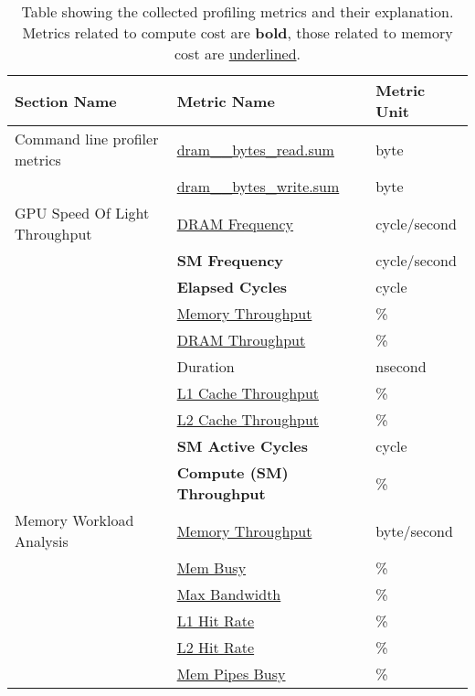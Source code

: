 \begin{table}[ht]
    \begin{tabular}{lll}
        \toprule
        Section Name                  & Metric Name                          & Metric Unit  \\
        \midrule\midrule
        Command line profiler metrics & \underline{dram\_\_bytes\_read.sum}  & byte         \\
                                      & \underline{dram\_\_bytes\_write.sum} & byte         \\
        GPU Speed Of Light Throughput & \underline{DRAM Frequency}           & cycle/second \\
                                      & \textbf{SM Frequency}                & cycle/second \\
                                      & \textbf{Elapsed Cycles}              & cycle        \\
                                      & \underline{Memory Throughput}        & \%           \\
                                      & \underline{DRAM Throughput}          & \%           \\
                                      & Duration                             & nsecond      \\
                                      & \underline{L1 Cache Throughput}      & \%           \\
                                      & \underline{L2 Cache Throughput}      & \%           \\
                                      & \textbf{SM Active Cycles}            & cycle        \\
                                      & \textbf{Compute (SM) Throughput}     & \%           \\
        Memory Workload Analysis      & \underline{Memory Throughput}        & byte/second  \\
                                      & \underline{Mem Busy}                 & \%           \\
                                      & \underline{Max Bandwidth}            & \%           \\
                                      & \underline{L1 Hit Rate}              & \%           \\
                                      & \underline{L2 Hit Rate}              & \%           \\
                                      & \underline{Mem Pipes Busy}           & \%           \\
        \bottomrule
    \end{tabular}
    \caption{Table showing the collected profiling metrics and their explanation. Metrics related to compute cost are \textbf{bold}, those related to memory cost are \underline{underlined}.}
    \label{tab:4-profiling-metrics}
\end{table}



